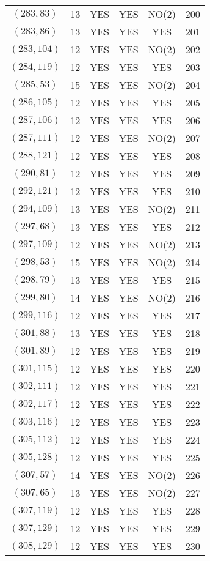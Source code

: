 \begin{longtable}{|c|c|c|c|c|c|}
$(283, 83)$ & 13 & YES & YES & NO(2) & 200\\
$(283, 86)$ & 13 & YES & YES & YES & 201\\
$(283, 104)$ & 12 & YES & YES & NO(2) & 202\\
$(284, 119)$ & 12 & YES & YES & YES & 203\\
$(285, 53)$ & 15 & YES & YES & NO(2) & 204\\
$(286, 105)$ & 12 & YES & YES & YES & 205\\
$(287, 106)$ & 12 & YES & YES & YES & 206\\
$(287, 111)$ & 12 & YES & YES & NO(2) & 207\\
$(288, 121)$ & 12 & YES & YES & YES & 208\\
$(290, 81)$ & 12 & YES & YES & YES & 209\\
$(292, 121)$ & 12 & YES & YES & YES & 210\\
$(294, 109)$ & 13 & YES & YES & NO(2) & 211\\
$(297, 68)$ & 13 & YES & YES & YES & 212\\
$(297, 109)$ & 12 & YES & YES & NO(2) & 213\\
$(298, 53)$ & 15 & YES & YES & NO(2) & 214\\
$(298, 79)$ & 13 & YES & YES & YES & 215\\
$(299, 80)$ & 14 & YES & YES & NO(2) & 216\\
$(299, 116)$ & 12 & YES & YES & YES & 217\\
$(301, 88)$ & 13 & YES & YES & YES & 218\\
$(301, 89)$ & 12 & YES & YES & YES & 219\\
$(301, 115)$ & 12 & YES & YES & YES & 220\\
$(302, 111)$ & 12 & YES & YES & YES & 221\\
$(302, 117)$ & 12 & YES & YES & YES & 222\\
$(303, 116)$ & 12 & YES & YES & YES & 223\\
$(305, 112)$ & 12 & YES & YES & YES & 224\\
$(305, 128)$ & 12 & YES & YES & YES & 225\\
$(307, 57)$ & 14 & YES & YES & NO(2) & 226\\
$(307, 65)$ & 13 & YES & YES & NO(2) & 227\\
$(307, 119)$ & 12 & YES & YES & YES & 228\\
$(307, 129)$ & 12 & YES & YES & YES & 229\\
$(308, 129)$ & 12 & YES & YES & YES & 230\\

\end{longtable}
